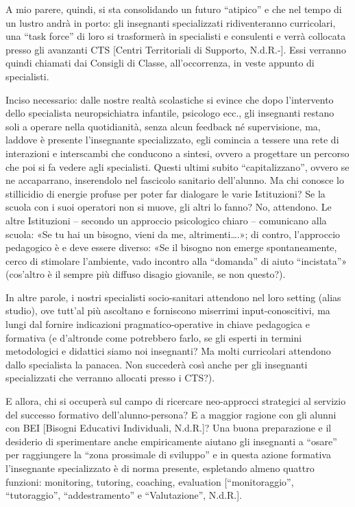A mio parere, quindi, si sta consolidando un futuro “atipico” e che nel tempo di un lustro andrà in porto: gli insegnanti specializzati ridiventeranno curricolari, una “task force” di loro si trasformerà in specialisti e consulenti e verrà collocata presso gli avanzanti CTS [Centri Territoriali di Supporto, N.d.R.-]. Essi verranno quindi chiamati dai Consigli di Classe, all'occorrenza, in veste appunto di specialisti.

Inciso necessario: dalle nostre realtà scolastiche si evince che dopo l'intervento dello specialista neuropsichiatra infantile, psicologo ecc., gli insegnanti restano soli a operare nella quotidianità, senza alcun feedback né supervisione, ma, laddove è presente l'insegnante specializzato, egli comincia a tessere una rete di interazioni e interscambi che conducono a sintesi, ovvero a progettare un percorso che poi si fa vedere agli specialisti. Questi ultimi subito “capitalizzano”, ovvero se ne accaparrano, inserendolo nel fascicolo sanitario dell'alunno. Ma chi conosce lo stillicidio di energie profuse per poter far dialogare le varie Istituzioni? Se la scuola con i suoi operatori non si muove, gli altri lo fanno? No, attendono. Le altre Istituzioni – secondo un approccio psicologico chiaro – comunicano alla scuola: «Se tu hai un bisogno, vieni da me, altrimenti….»; di contro, l'approccio pedagogico è e deve essere diverso: «Se il bisogno non emerge spontaneamente, cerco di stimolare l'ambiente, vado incontro alla “domanda” di aiuto “incistata”» (cos'altro è il sempre più diffuso disagio giovanile, se non questo?).

In altre parole, i nostri specialisti socio-sanitari attendono nel loro setting (alias studio), ove tutt'al più ascoltano e forniscono miserrimi input-conoscitivi, ma lungi dal fornire indicazioni pragmatico-operative in chiave pedagogica e formativa (e d'altronde come potrebbero farlo, se gli esperti in termini metodologici e didattici siamo noi insegnanti? Ma molti curricolari attendono dallo specialista la panacea. Non succederà così anche per gli insegnanti specializzati che verranno allocati presso i CTS?).

E allora, chi si occuperà sul campo di ricercare neo-approcci strategici al servizio del successo formativo dell'alunno-persona? E a maggior ragione con gli alunni con BEI [Bisogni Educativi Individuali, N.d.R.]? Una buona preparazione e il desiderio di sperimentare anche empiricamente aiutano gli insegnanti a “osare” per raggiungere la “zona prossimale di sviluppo” e in questa azione formativa l'insegnante specializzato è di norma presente, espletando almeno quattro funzioni: monitoring, tutoring, coaching, evaluation [“monitoraggio”, “tutoraggio”, “addestramento” e “Valutazione”, N.d.R.].
